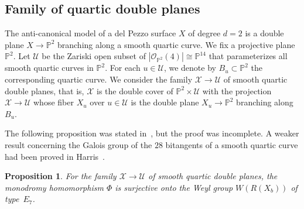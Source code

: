 \documentclass{math}
\theoremstyle{plain}
\newtheorem{proposition}[theorem]{Proposition}
\numberwithin{equation}{section}
\newcommand{\PP}{\mathord{\mathbb  P}}
\newcommand{\OOO}{\mathord{\mathcal O}}
\newcommand{\UUU}{\mathord{\mathcal U}}
\newcommand{\XXX}{\mathord{\mathcal X}}
\newcommand{\mon}{\Phi}
\begin{document}
\subsection{Family of quartic double planes}\label{subsec:quartic}
%
The anti-canonical model of a del Pezzo surface
$X$ of degree $d=2$ is a double plane
$X\to \PP^2$ branching along a smooth quartic curve.
%
We fix a projective plane $\PP^2$. 
Let  $\UUU$ be the Zariski open subset of 
$|\OOO_{\PP^2} (4)|\cong \PP^{14}$
that parameterizes all smooth quartic curves in $\PP^2$.
For each $u\in \UUU$,
we denote by  $B_u\subset \PP^2$  the corresponding quartic curve.
We consider the family 
 $\XXX\to \UUU$ 
 of smooth quartic double planes,
that is, 
 $\XXX$ is the double cover of $\PP^2\times \UUU$ with the projection  $ \XXX\to \UUU$ 
 whose fiber  $X_u$ over $u\in \UUU$
 is  the double plane $X_u\to \PP^2$
branching along $B_u$.
%
\par
The following proposition was stated in~\cite{Shimada2022}, but the proof was incomplete.
A weaker result concerning
the Galois group of the $28$ bitangents of a smooth quartic curve had been proved  in  Harris~\cite{Harris1979}.
%
\begin{proposition}\label{prop:WE7}
For the  family 
 $ \XXX\to \UUU$ 
 of smooth quartic double planes,
 the monodromy homomorphism $\mon$ %
 is surjective onto the Weyl group $W(R(X_b))$ 
 of type~$E_7$.
\end{proposition}
%
%
\end{document}
